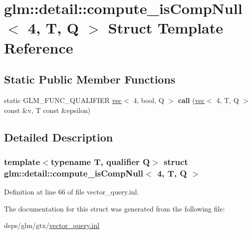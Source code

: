 \hypertarget{structglm_1_1detail_1_1compute__isCompNull_3_014_00_01T_00_01Q_01_4}{}\section{glm\+:\+:detail\+:\+:compute\+\_\+is\+Comp\+Null$<$ 4, T, Q $>$ Struct Template Reference}
\label{structglm_1_1detail_1_1compute__isCompNull_3_014_00_01T_00_01Q_01_4}
\subsection*{Static Public Member Functions}
\begin{DoxyCompactItemize}
\item 
\mbox{\label{structglm_1_1detail_1_1compute__isCompNull_3_014_00_01T_00_01Q_01_4_aff1dc41c1dcdc2849505c73ec3d392ac}} 
static G\+L\+M\+\_\+\+F\+U\+N\+C\+\_\+\+Q\+U\+A\+L\+I\+F\+I\+ER \hyperlink{structglm_1_1vec}{vec}$<$ 4, bool, Q $>$ {\bfseries call} (\hyperlink{structglm_1_1vec}{vec}$<$ 4, T, Q $>$ const \&v, T const \&epsilon)
\end{DoxyCompactItemize}


\subsection{Detailed Description}
\subsubsection*{template$<$typename T, qualifier Q$>$\newline
struct glm\+::detail\+::compute\+\_\+is\+Comp\+Null$<$ 4, T, Q $>$}



Definition at line 66 of file vector\+\_\+query.\+inl.



The documentation for this struct was generated from the following file\+:\begin{DoxyCompactItemize}
\item 
deps/glm/gtx/\hyperlink{vector__query_8inl}{vector\+\_\+query.\+inl}\end{DoxyCompactItemize}

